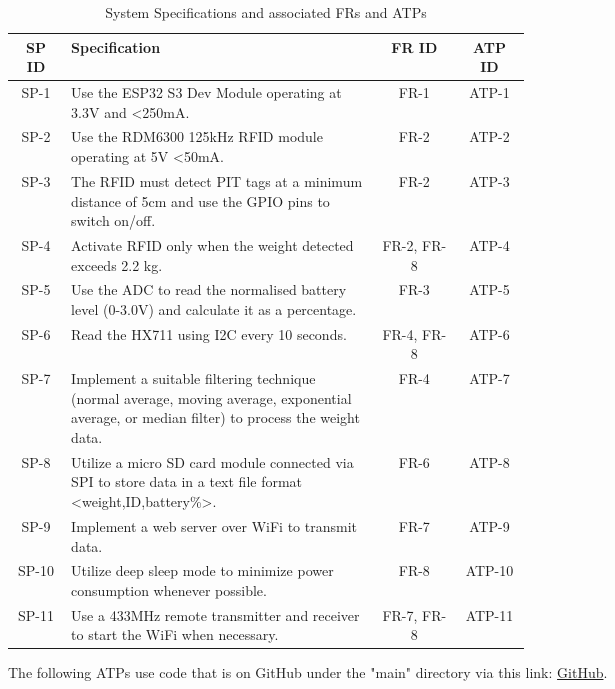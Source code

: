 \documentclass[class=report,11pt,crop=false]{standalone}
\begin{document}
\begin{table}[h]
    \centering
    \small
    {\begin{tabular}{|c|p{0.6\linewidth}|c|c|}
    \hline
    \textbf{SP ID} & \textbf{Specification} & \textbf{FR ID} & \textbf{ATP ID} \\
    \hline
    SP-1 & Use the ESP32 S3 Dev Module operating at 3.3V and <250mA. & FR-1 & ATP-1 \\
    \hline
    SP-2 & Use the RDM6300 125kHz RFID module operating at 5V <50mA. & FR-2 & ATP-2 \\
    \hline
    SP-3 & The RFID must detect PIT tags at a minimum distance of 5cm and use the GPIO pins to switch on/off.  & FR-2 & ATP-3 \\
    \hline
    SP-4 & Activate RFID only when the weight detected exceeds 2.2 kg. & FR-2, FR-8 & ATP-4 \\
    \hline
    SP-5 & Use the ADC to read the normalised battery level (0-3.0V) and calculate it as a percentage. & FR-3 & ATP-5 \\
    \hline
    SP-6 & Read the HX711 using I2C every 10 seconds. & FR-4, FR-8 & ATP-6 \\
    \hline
    SP-7 & Implement a suitable filtering technique (normal average, moving average, exponential average, or median filter) to process the weight data. & FR-4 & ATP-7 \\
    \hline
    SP-8 & Utilize a micro SD card module connected via SPI to store data in a text file format <weight,ID,battery\%>. & FR-6 & ATP-8 \\
    \hline
    SP-9 & Implement a web server over WiFi to transmit data. & FR-7 & ATP-9 \\
    \hline
    SP-10 & Utilize deep sleep mode to minimize power consumption whenever possible. & FR-8 & ATP-10 \\
    \hline
    SP-11 & Use a 433MHz remote transmitter and receiver to start the WiFi when necessary. & FR-7, FR-8 & ATP-11 \\
    \hline
\end{tabular}}
\caption{System Specifications and associated FRs and ATPs}
\label{tab:SP}
\end{table}

The following ATPs use code that is on GitHub under the "main" directory via this link: \href{https://github.com/Sitengwu/EEE4113F-Group-10-2024}{GitHub}.
\end{document}
